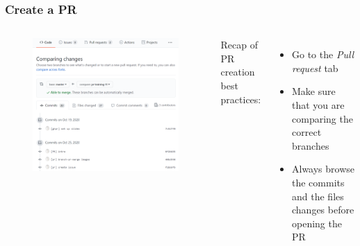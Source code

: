 \documentclass[aspectratio=169]{beamer} %
\begin{document}
\begin{frame}
	\frametitle{Create a PR}
	\begin{columns}[c]
		
		\vspace{-.5cm}
		\begin{figure}
			\centering
			\includegraphics[width=\textwidth]{./img/create-pr-0.png}
		\end{figure}
		
		Recap of PR creation best practices:
		\vspace{.5cm}
		\begin{itemize}
			\setlength\itemsep{.5em}
			\item Go to the \textit{Pull request} tab
			\item Make sure that you are comparing the correct branches
			\item Always browse the commits and the files changes before opening the PR
		\end{itemize}
		
	\end{columns}	
\end{frame}
\end{document}
